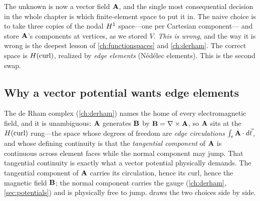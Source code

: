 The unknown is now a vector field $\mathbf{A}$, and the single most consequential decision
in the whole chapter is which finite-element space to put it in. The naive choice
is to take three copies of the nodal $H^1$ space---one per Cartesian component---
and store $\mathbf{A}$'s components at vertices, as we stored $V$. \emph{This is wrong},
and the way it is wrong is the deepest lesson of \cref{ch:functionspaces} and
\cref{ch:derham}. The correct space is $H(\mathrm{curl})$, realized by \emph{edge elements}
(N\'ed\'elec elements). This is the second swap.

\subsection{Why a vector potential wants edge elements}

The de Rham complex (\cref{ch:derham}) names the home of every electromagnetic
field, and it is unambiguous: $\mathbf{A}$ generates $\mathbf{B}$ by $\mathbf{B}=\nabla\times\mathbf{A}$, so $\mathbf{A}$ sits
at the $H(\mathrm{curl})$ rung---the space whose degrees of freedom are \emph{edge
circulations} $\int_e\mathbf{A}\cdot d\vec\ell$, and whose defining continuity is that the
\emph{tangential component} of $\mathbf{A}$ is continuous across element faces while the
normal component may jump. That tangential continuity is exactly what a vector
potential physically demands. The tangential component of $\mathbf{A}$ carries its
circulation, hence its curl, hence the magnetic field $\mathbf{B}$; the normal component
carries the gauge (\cref{ch:derham}, \cref{sec:potentials}) and is physically
free to jump.  draws the two choices side by side.

